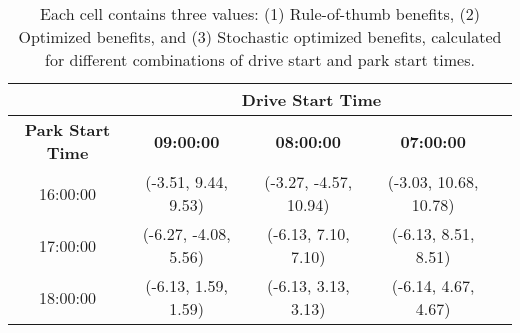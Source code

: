 \documentclass{article}
\begin{document}
\begin{table}[h!]
\centering
\begin{tabular}{|c|c|c|c|c|}
\hline
\multicolumn{1}{|c|}{} & \multicolumn{3}{|c|}{\textbf{Drive Start Time}} \\ \hline
\textbf{Park Start Time} & \textbf{09:00:00} & \textbf{08:00:00} & \textbf{07:00:00}  \\ \hline
16:00:00 & (-3.51, 9.44, 9.53) & (-3.27, -4.57, 10.94) & (-3.03, 10.68, 10.78) \\ 
17:00:00 & (-6.27, -4.08, 5.56) & (-6.13, 7.10, 7.10) & (-6.13, 8.51, 8.51) \\ 
18:00:00 & (-6.13, 1.59, 1.59) & (-6.13, 3.13, 3.13) & (-6.14, 4.67, 4.67) \\ 
\hline
\end{tabular}
\caption{Each cell contains three values: (1) Rule-of-thumb benefits, (2) Optimized benefits, and (3) Stochastic optimized benefits, calculated for different combinations of drive start and park start times.}
\end{table}
\end{document}
